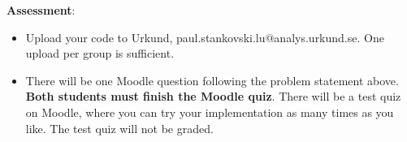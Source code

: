 \documentclass{article}
\begin{document}
\begin{description}
{				\textbf{Assessment}:
				\begin{itemize}
					\item Upload your code to Urkund, paul.stankovski.lu@analys.urkund.se.
					One upload per group is sufficient.
					
					\item There will be one Moodle question following the problem statement above. 
					\textbf{Both students must finish the Moodle quiz}.
					There will be a test quiz on Moodle, where you can try your implementation as many times as you like. 
					The test quiz will not be graded.
				\end{itemize}
			}
			
		\end{description}
		
	
\end{document}
